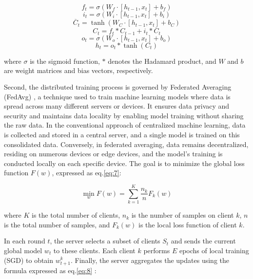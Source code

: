 \documentclass[pdflatex,sn-mathphys-num]{sn-jnl}
\theoremstyle{thmstyleone}
\theoremstyle{thmstyletwo}
\theoremstyle{thmstylethree}
\begin{document}
\begin{equation}\label{eq:1}
f_{t}=\sigma(W_{f}\cdot[h_{t-1},x_{t}]+b_{f})
\end{equation}
\begin{equation}\label{eq:2}
i_{t}=\sigma(W_{i}\cdot[h_{t-1},x_{t}]+b_{i})
\end{equation}
\begin{equation}\label{eq:3}
\overline{C}_{t}=\tanh(W_{C}\cdot[h_{t-1},x_{t}]+b_{C})
\end{equation}
\begin{equation}\label{eq:4}
C_{t}=f_{t}*C_{t-1}+i_{t}*\overline{C}_{t}
\end{equation}
\begin{equation}\label{eq:5}
o_{t}=\sigma(W_{o}\cdot[h_{t-1},x_{t}]+b_{o})
\end{equation}
\begin{equation}\label{eq:6}
h_{t}=o_{t}*\tanh(C_{t})
\end{equation}

where $\sigma$ is the sigmoid function, $*$ denotes the Hadamard product, and $W$ and $b$ are weight matrices and bias vectors, respectively.

Second, the distributed training process is governed by Federated Averaging (FedAvg) \cite{mcmahan2017fedavg}, a technique used to train machine learning models where data is spread across many different servers or devices. It ensures data privacy and security and maintains data locality by enabling model training without sharing the raw data. In the conventional approach of centralized machine learning, data is collected and stored in a central server, and a single model is trained on this consolidated data. Conversely, in federated averaging, data remains decentralized, residing on numerous devices or edge devices, and the model's training is conducted locally on each specific device. The goal is to minimize the global loss function $F(w)$, expressed as eq.\eqref{eq:7}:

\begin{equation}\label{eq:7}
\min_{w}F(w)=\sum_{k=1}^{K}\frac{n_{k}}{n}F_{k}(w)
\end{equation}

where $K$ is the total number of clients, $n_{k}$ is the number of samples on client $k$, $n$ is the total number of samples, and $F_{k}(w)$ is the local loss function of client $k$.

In each round $t$, the server selects a subset of clients $S_{t}$ and sends the current global model $w_{t}$ to these clients. Each client $k$ performs $E$ epochs of local training (SGD) to obtain $w_{t+1}^{k}$. Finally, the server aggregates the updates using the formula expressed as eq.\eqref{eq:8} \cite{mcmahan2017fedavg}:
\end{document}
